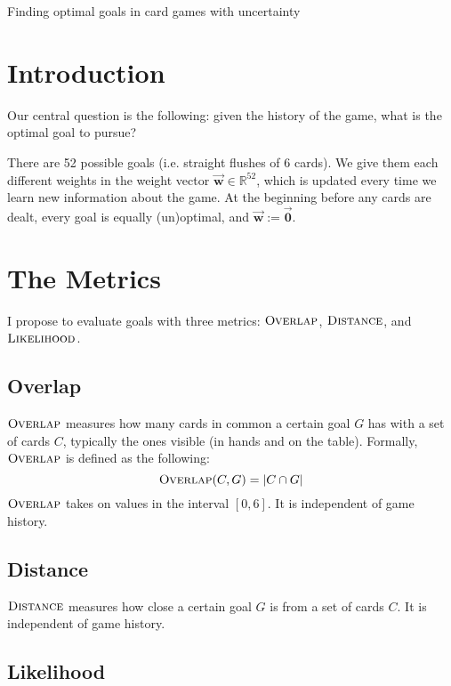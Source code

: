 \documentclass[11pt]{article}
\newcommand{\bvec}[1]{\vec{\mathbf{#1}}}
\newcommand{\R}{\mathbb{R}}
\newcommand{\dist}{\textsc{Distance}}
\newcommand{\overlap}{\textsc{Overlap}}
\newcommand{\lkhd}{\textsc{Likelihood}}
\begin{document}
\begin{center}
\Large{Finding optimal goals in card games with uncertainty}
\end{center}

\section{Introduction}

Our central question is the following: given the history of the game, what is the optimal goal to pursue?

There are 52 possible goals (i.e. straight flushes of 6 cards). We give them each different weights in the weight vector $\bvec{w} \in \R^{52}$, which is updated every time we learn new information about the game. At the beginning before any cards are dealt, every goal is equally (un)optimal, and $\bvec{w} := \bvec{0}$.

\section{The Metrics}

I propose to evaluate goals with three metrics: $\overlap$, $\dist$, and $\lkhd$.

\subsection{Overlap}

$\overlap$ measures how many cards in common a certain goal $G$ has with a set of cards $C$, typically the ones visible (in hands and on the table). Formally, $\overlap$ is defined as the following:
\begin{equation}
\overlap(C,G) = |C \cap G|
\label{eq:overlap} \end{equation}
$\overlap$ takes on values in the interval $[0,6]$. It is independent of game history.

\subsection{Distance}

$\dist$ measures how close a certain goal $G$ is from a set of cards $C$. It is independent of game history.

\subsection{Likelihood}
\end{document}
